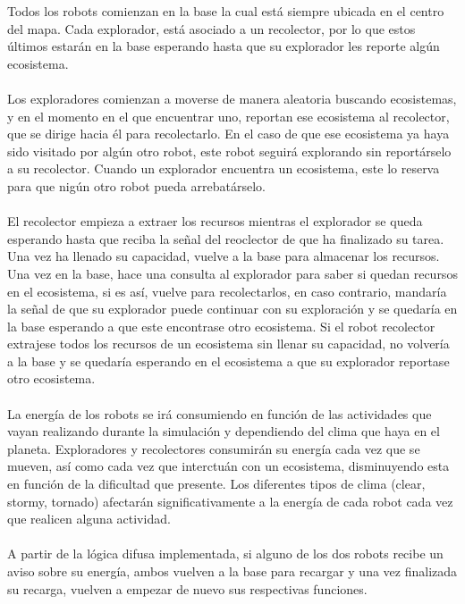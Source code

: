 \documentclass[a4paper,12pt]{article}
\begin{document}
Todos los robots comienzan en la base la cual está siempre ubicada en el centro del mapa. Cada explorador, está asociado a un recolector, por lo que estos últimos estarán en la base esperando hasta que su explorador les reporte algún ecosistema.
\\\\
Los exploradores comienzan a moverse de manera aleatoria buscando ecosistemas, y en el momento en el que encuentrar uno, reportan ese ecosistema al recolector, que se dirige hacia él para recolectarlo. En el caso de que ese ecosistema ya haya sido visitado por algún otro robot, este robot seguirá explorando sin reportárselo a su recolector. Cuando un explorador encuentra un ecosistema, este lo reserva para que nigún otro robot pueda arrebatárselo.
\\\\
El recolector empieza a extraer los recursos mientras el explorador se queda esperando hasta que reciba la señal del reoclector de que ha finalizado su tarea. Una vez ha llenado su capacidad, vuelve a la base para almacenar los recursos. Una vez en la base, hace una consulta al explorador para saber si quedan recursos en el ecosistema, si es así, vuelve para recolectarlos, en caso contrario, mandaría la señal de que su explorador puede continuar con su exploración y se quedaría en la base esperando a que este encontrase otro ecosistema. Si el robot recolector extrajese todos los recursos de un ecosistema sin llenar su capacidad, no volvería a la base y se quedaría esperando en el ecosistema a que su explorador reportase otro ecosistema. 
\\\\
La energía de los robots se irá consumiendo en función de las actividades que vayan realizando durante la simulación y dependiendo del clima que haya en el planeta. Exploradores y recolectores consumirán su energía cada vez que se mueven, así como cada vez que interctuán con un ecosistema, disminuyendo esta en función de la dificultad que presente. Los diferentes tipos de clima (clear, stormy, tornado) afectarán significativamente a la energía de cada robot cada vez que realicen alguna actividad.
\\\\
A partir de la lógica difusa implementada, si alguno de los dos robots recibe un aviso sobre su energía, ambos vuelven a la base para recargar y una vez finalizada su recarga, vuelven a empezar de nuevo sus respectivas funciones.
\\\\
\end{document}

